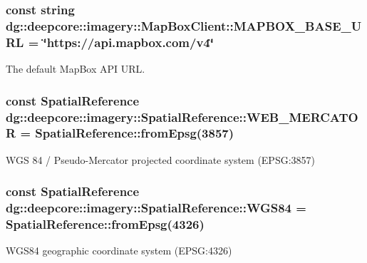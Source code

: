 \subsubsection[{\texorpdfstring{M\+A\+P\+B\+O\+X\+\_\+\+B\+A\+S\+E\+\_\+\+U\+RL}{MAPBOX_BASE_URL}}]{\setlength{\rightskip}{0pt plus 5cm}const string dg\+::deepcore\+::imagery\+::\+Map\+Box\+Client\+::\+M\+A\+P\+B\+O\+X\+\_\+\+B\+A\+S\+E\+\_\+\+U\+RL = \char`\"{}https\+://api.\+mapbox.\+com/v4\char`\"{}\hspace{0.3cm}{\ttfamily [static]}}\hypertarget{group___imagery_module_gae7617429b79fb76140ac754cbe1a52d5}{}\label{group___imagery_module_gae7617429b79fb76140ac754cbe1a52d5}


The default Map\+Box A\+PI U\+RL. 

\subsubsection[{\texorpdfstring{W\+E\+B\+\_\+\+M\+E\+R\+C\+A\+T\+OR}{WEB_MERCATOR}}]{\setlength{\rightskip}{0pt plus 5cm}const Spatial\+Reference dg\+::deepcore\+::imagery\+::\+Spatial\+Reference\+::\+W\+E\+B\+\_\+\+M\+E\+R\+C\+A\+T\+OR = Spatial\+Reference\+::from\+Epsg(3857)\hspace{0.3cm}{\ttfamily [static]}}\hypertarget{group___imagery_module_ga66b2040219d82bc89193cc0a0bba177a}{}\label{group___imagery_module_ga66b2040219d82bc89193cc0a0bba177a}


W\+GS 84 / Pseudo-\/\+Mercator projected coordinate system (E\+P\+SG\+:3857) 

\subsubsection[{\texorpdfstring{W\+G\+S84}{WGS84}}]{\setlength{\rightskip}{0pt plus 5cm}const Spatial\+Reference dg\+::deepcore\+::imagery\+::\+Spatial\+Reference\+::\+W\+G\+S84 = Spatial\+Reference\+::from\+Epsg(4326)\hspace{0.3cm}{\ttfamily [static]}}\hypertarget{group___imagery_module_gaf868e08b25599956326615463649b0fa}{}\label{group___imagery_module_gaf868e08b25599956326615463649b0fa}


W\+G\+S84 geographic coordinate system (E\+P\+SG\+:4326) 


